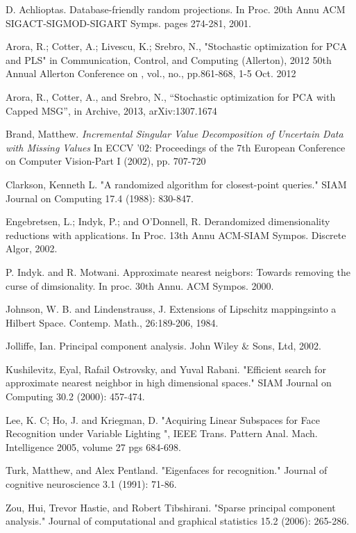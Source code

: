 \documentclass[11pt,letterpaper]{article}
\begin{document}
\begin{thebibliography}{20}


  D. Achlioptas. Database-friendly random projections. In Proc. 20th Annu ACM SIGACT-SIGMOD-SIGART Symps. pages 274-281, 2001. 
  
 Arora, R.; Cotter, A.; Livescu, K.; Srebro, N., "Stochastic optimization for PCA and PLS" in Communication, Control, and Computing (Allerton), 2012 50th Annual Allerton Conference on , vol., no., pp.861-868, 1-5 Oct. 2012
  
 Arora, R., Cotter, A., and Srebro, N., ``Stochastic optimization for PCA with Capped MSG'', in Archive, 2013, arXiv:1307.1674 
  
  Brand, Matthew. {\em Incremental Singular Value Decomposition of Uncertain Data with Missing Values} In ECCV '02: Proceedings of the 7th European Conference on Computer Vision-Part I (2002), pp. 707-720
  
 Clarkson, Kenneth L. "A randomized algorithm for closest-point queries." SIAM Journal on Computing 17.4 (1988): 830-847.
  
  Engebretsen, L.; Indyk, P.; and O'Donnell, R. Derandomized dimensionality reductions with applications. In Proc. 13th Annu ACM-SIAM Sympos. Discrete Algor, 2002. 
  
  P. Indyk. and R. Motwani. Approximate nearest neigbors: Towards removing the curse of dimsionality. In proc. 30th Annu. ACM Sympos. 2000.
  
  Johnson, W. B. and Lindenstrauss, J. Extensions of Lipschitz mappingsinto a Hilbert Space. Contemp. Math., 26:189-206, 1984.

 Jolliffe, Ian. Principal component analysis. John Wiley $\&$ Sons, Ltd, 2002.
  
  Kushilevitz, Eyal, Rafail Ostrovsky, and Yuval Rabani. "Efficient search for approximate nearest neighbor in high dimensional spaces." SIAM Journal on Computing 30.2 (2000): 457-474.
 
  Lee, K. C; Ho, J. and Kriegman, D. "Acquiring Linear Subspaces for Face Recognition under Variable Lighting ", IEEE Trans. Pattern Anal. Mach. Intelligence 2005, volume 27 pgs 684-698.  
 
 Turk, Matthew, and Alex Pentland. "Eigenfaces for recognition." Journal of cognitive neuroscience 3.1 (1991): 71-86.
  
 Zou, Hui, Trevor Hastie, and Robert Tibshirani. "Sparse principal component analysis." Journal of computational and graphical statistics 15.2 (2006): 265-286.
  
\end{thebibliography}


\end{document}
